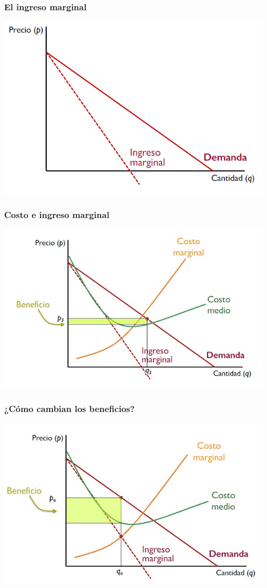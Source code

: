\documentclass{beamer}
\begin{document}
\begin{frame}
\frametitle{El ingreso marginal}
\includegraphics[scale=0.6]{Slides Principios de Economia/Figures/Tema_06.33_ingresomarginal.png}
\end{frame}

\begin{frame}
\frametitle{Costo e ingreso marginal}
\includegraphics[scale=0.6]{Slides Principios de Economia/Figures/Tema_06.36_beneficios3.jpg}
\end{frame}

\begin{frame}
\frametitle{¿Cómo cambian los beneficios?}
\includegraphics[scale=0.6]{Slides Principios de Economia/Figures/Tema_06.35_beneficios2.jpg}
\end{frame}
\end{document}
